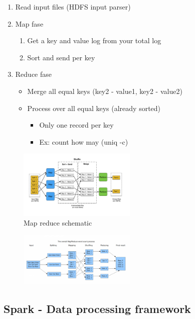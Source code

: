 \documentclass{article}
\begin{document}
\begin{enumerate}
    \item Read input files (HDFS input parser)
    \item Map fase
    \begin{enumerate}
        \item Get a key and value log from your total log
        \item Sort and send per key
    \end{enumerate}
    \item Reduce fase
    \begin{itemize}
        \item Merge all equal keys (key2 - value1, key2 - value2)
        \item Process over all equal keys (already sorted)
        \begin{itemize}
            \item Only one record per key
            \item Ex: count how may (uniq -c)
        \end{itemize}
    \end{itemize}
\end{enumerate}

\begin{figure}[H]
    \centering
    \includegraphics[width=0.5\textwidth]{map-reduce.jpg}
    \caption{Map reduce schematic}
\end{figure}

\begin{figure}[H]
    \centering
    \includegraphics[width=0.5\textwidth]{map-reduce-wordcount.png}
    \caption{}
\end{figure}

\subsection{Spark - Data processing framework}
\end{document}
